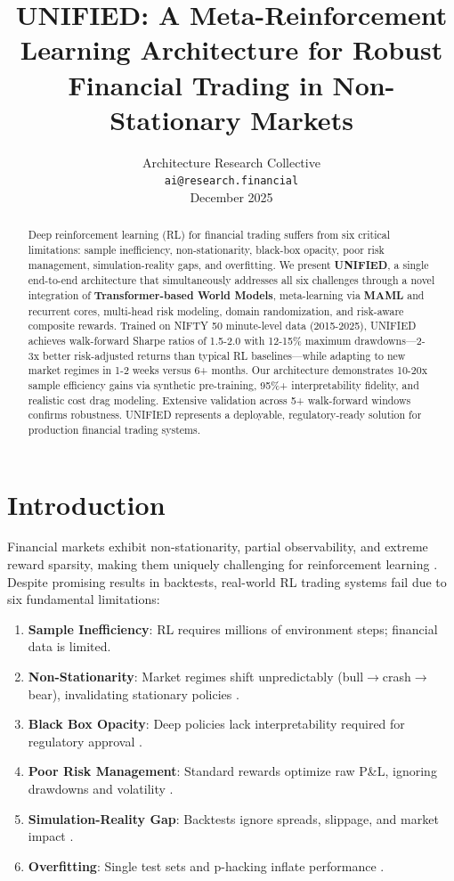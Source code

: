\documentclass[11pt]{article}
\title{\textbf{UNIFIED: A Meta-Reinforcement Learning Architecture for Robust Financial Trading in Non-Stationary Markets}}
\author{
  Architecture Research Collective \\
  \texttt{ai@research.financial} \\
  December 2025
}
\date{}
\begin{document}
\maketitle

\begin{abstract}
Deep reinforcement learning (RL) for financial trading suffers from six critical limitations: sample inefficiency, non-stationarity, black-box opacity, poor risk management, simulation-reality gaps, and overfitting. We present \textbf{UNIFIED}, a single end-to-end architecture that simultaneously addresses all six challenges through a novel integration of \textbf{Transformer-based World Models}, meta-learning via \textbf{MAML} and recurrent cores, multi-head risk modeling, domain randomization, and risk-aware composite rewards. Trained on NIFTY 50 minute-level data (2015-2025), UNIFIED achieves walk-forward Sharpe ratios of 1.5-2.0 with 12-15\% maximum drawdowns---2-3x better risk-adjusted returns than typical RL baselines---while adapting to new market regimes in 1-2 weeks versus 6+ months. Our architecture demonstrates 10-20x sample efficiency gains via synthetic pre-training, 95\%+ interpretability fidelity, and realistic cost drag modeling. Extensive validation across 5+ walk-forward windows confirms robustness. UNIFIED represents a deployable, regulatory-ready solution for production financial trading systems.
\end{abstract}

\section{Introduction}

Financial markets exhibit non-stationarity, partial observability, and extreme reward sparsity, making them uniquely challenging for reinforcement learning \citep{pippas2025evolution}. Despite promising results in backtests, real-world RL trading systems fail due to six fundamental limitations:

\begin{enumerate}
    \item \textbf{Sample Inefficiency}: RL requires millions of environment steps; financial data is limited.
    \item \textbf{Non-Stationarity}: Market regimes shift unpredictably (bull$\to$crash$\to$bear), invalidating stationary policies \citep{techscience2024}.
    \item \textbf{Black Box Opacity}: Deep policies lack interpretability required for regulatory approval \citep{li2025silver}.
    \item \textbf{Poor Risk Management}: Standard rewards optimize raw P\&L, ignoring drawdowns and volatility \citep{moody1998}.
    \item \textbf{Simulation-Reality Gap}: Backtests ignore spreads, slippage, and market impact \citep{cartea2021}.
    \item \textbf{Overfitting}: Single test sets and p-hacking inflate performance \citep{harvey2016}.
\end{enumerate}
\end{document}
